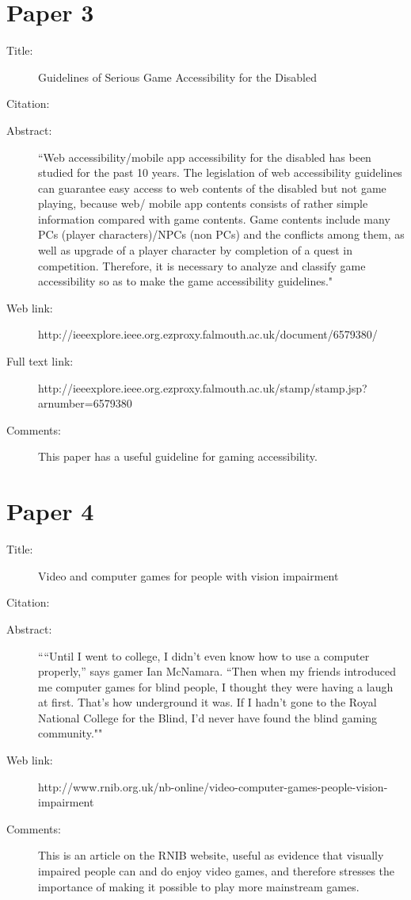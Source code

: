 \documentclass{scrartcl}
\begin{document}
\section*{Paper 3}
\begin{description}
\item[Title:] Guidelines of Serious Game Accessibility for the Disabled
\item[Citation:] \cite{H.J.Park}
\item[Abstract:] ``Web accessibility/mobile app accessibility for the disabled has been studied for the past 10 years. The legislation of web accessibility guidelines can guarantee easy access to web contents of the disabled but not game playing, because web/ mobile app contents consists of rather simple information compared with game contents. Game contents include many PCs (player characters)/NPCs (non PCs) and the conflicts among them, as well as upgrade of a player character by completion of a quest in competition. Therefore, it is necessary to analyze and classify game accessibility so as to make the game accessibility guidelines."
\item[Web link:] http://ieeexplore.ieee.org.ezproxy.falmouth.ac.uk/document/6579380/
\item[Full text link:] http://ieeexplore.ieee.org.ezproxy.falmouth.ac.uk/stamp/stamp.jsp?arnumber=6579380
\item[Comments:] This paper has a useful guideline for gaming accessibility. 
\end{description}

\section*{Paper 4}
\begin{description}
\item[Title:] Video and computer games for people with vision impairment
\item[Citation:] \cite{rnib}
\item[Abstract:] ``“Until I went to college, I didn’t even know how to use a computer properly,” says gamer Ian McNamara. “Then when my friends introduced me computer games for blind people, I thought they were having a laugh at first. That’s how underground it was. If I hadn’t gone to the Royal National College for the Blind, I’d never have found the blind gaming community.""
\item[Web link:] http://www.rnib.org.uk/nb-online/video-computer-games-people-vision-impairment
\item[Comments:] This is an article on the RNIB website, useful as evidence that visually impaired people can and do enjoy video games, and therefore stresses the importance of making it possible to play more mainstream games.
\end{description}
\end{document}
